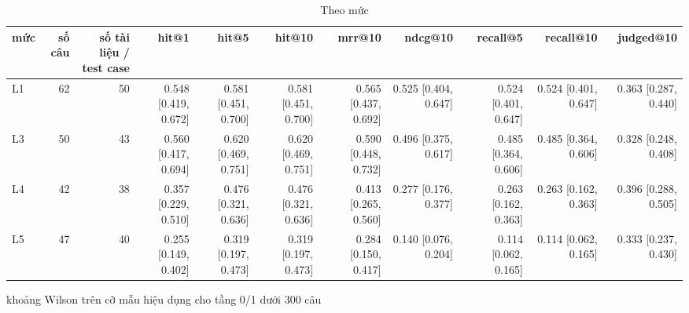 \begin{table}[ht]
\centering
\caption{Theo mức}
\begin{tabular}{lrrrrrrrrrr}
\toprule
mức & số câu & số tài liệu / test case & hit@1 & hit@5 & hit@10 & mrr@10 & ndcg@10 & recall@5 & recall@10 & judged@10 \\
\midrule
L1 & 62 & 50 & 0.548 [0.419, 0.672] & 0.581 [0.451, 0.700] & 0.581 [0.451, 0.700] & 0.565 [0.437, 0.692] & 0.525 [0.404, 0.647] & 0.524 [0.401, 0.647] & 0.524 [0.401, 0.647] & 0.363 [0.287, 0.440] \\
L3 & 50 & 43 & 0.560 [0.417, 0.694] & 0.620 [0.469, 0.751] & 0.620 [0.469, 0.751] & 0.590 [0.448, 0.732] & 0.496 [0.375, 0.617] & 0.485 [0.364, 0.606] & 0.485 [0.364, 0.606] & 0.328 [0.248, 0.408] \\
L4 & 42 & 38 & 0.357 [0.229, 0.510] & 0.476 [0.321, 0.636] & 0.476 [0.321, 0.636] & 0.413 [0.265, 0.560] & 0.277 [0.176, 0.377] & 0.263 [0.162, 0.363] & 0.263 [0.162, 0.363] & 0.396 [0.288, 0.505] \\
L5 & 47 & 40 & 0.255 [0.149, 0.402] & 0.319 [0.197, 0.473] & 0.319 [0.197, 0.473] & 0.284 [0.150, 0.417] & 0.140 [0.076, 0.204] & 0.114 [0.062, 0.165] & 0.114 [0.062, 0.165] & 0.333 [0.237, 0.430] \\
\bottomrule
\end{tabular}
\par\smallskip\footnotesize khoảng Wilson trên cỡ mẫu hiệu dụng cho tầng 0/1 dưới 300 câu
\end{table}

